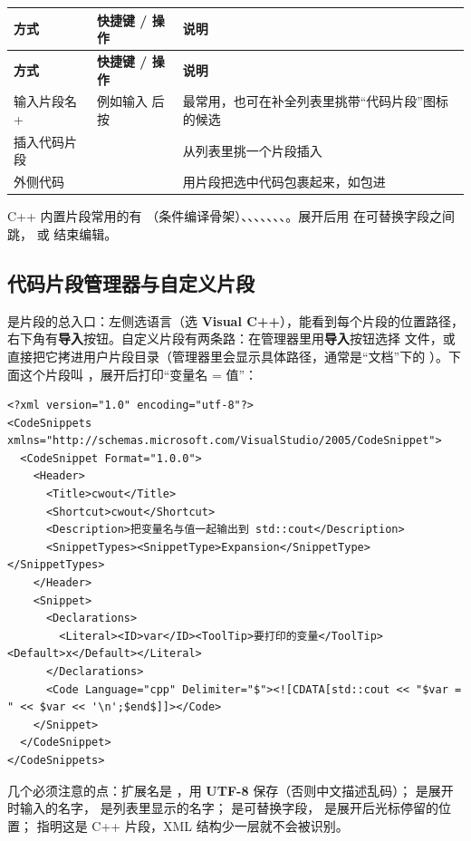 \begin{longtable}{L{4.0cm}L{4.6cm}L{6.0cm}}\toprule
\textbf{方式} & \textbf{快捷键 / 操作} & \textbf{说明} \\ \midrule \endfirsthead
\toprule \textbf{方式} & \textbf{快捷键 / 操作} & \textbf{说明} \\ \midrule \endhead \bottomrule \endlastfoot
输入片段名 +  & 例如输入  后按  & 最常用，也可在补全列表里挑带“代码片段”图标的候选 \\
插入代码片段 &  & 从列表里挑一个片段插入 \\
外侧代码 &  & 用片段把选中代码包裹起来，如包进  \\
\end{longtable}
C++ 内置片段常用的有 （条件编译骨架）、、、、、、、。展开后用  在可替换字段之间跳， 或  结束编辑。

\subsection{代码片段管理器与自定义片段}

是片段的总入口：左侧选语言（选 \textbf{Visual C++}），能看到每个片段的位置路径，右下角有\textbf{导入}按钮。自定义片段有两条路：在管理器里用\textbf{导入}按钮选择  文件，或直接把它拷进用户片段目录（管理器里会显示具体路径，通常是“文档”下的 ）。下面这个片段叫 ，展开后打印“变量名 = 值”：

\begin{lstlisting}[style=xmlstyle]
<?xml version="1.0" encoding="utf-8"?>
<CodeSnippets xmlns="http://schemas.microsoft.com/VisualStudio/2005/CodeSnippet">
  <CodeSnippet Format="1.0.0">
    <Header>
      <Title>cwout</Title>
      <Shortcut>cwout</Shortcut>
      <Description>把变量名与值一起输出到 std::cout</Description>
      <SnippetTypes><SnippetType>Expansion</SnippetType></SnippetTypes>
    </Header>
    <Snippet>
      <Declarations>
        <Literal><ID>var</ID><ToolTip>要打印的变量</ToolTip><Default>x</Default></Literal>
      </Declarations>
      <Code Language="cpp" Delimiter="$"><![CDATA[std::cout << "$var = " << $var << '\n';$end$]]></Code>
    </Snippet>
  </CodeSnippet>
</CodeSnippets>
\end{lstlisting}
几个必须注意的点：扩展名是 ，用 \textbf{UTF-8} 保存（否则中文描述乱码）； 是展开时输入的名字， 是列表里显示的名字； 是可替换字段， 是展开后光标停留的位置； 指明这是 C++ 片段，XML 结构少一层就不会被识别。

